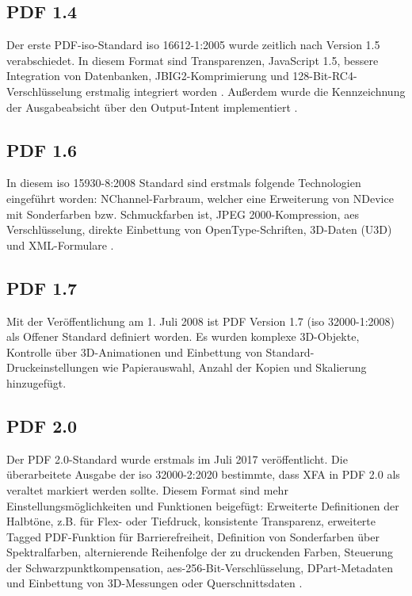 \subsection{PDF 1.4}
Der erste PDF-\gls{iso}-Standard \gls{iso} 16612-1:2005 wurde zeitlich nach Version 1.5 verabschiedet. In diesem Format sind Transparenzen, JavaScript 1.5, bessere Integration von Datenbanken, JBIG2-Komprimierung und 128-Bit-RC4-Verschlüsselung erstmalig integriert worden \cite{proj-consult}. Außerdem wurde die Kennzeichnung der Ausgabeabsicht über den Output-Intent implementiert \cite{schneeberger}.

\subsection{PDF 1.6}
In diesem \gls{iso} 15930-8:2008 Standard sind erstmals folgende Technologien eingeführt worden: NChannel-Farbraum, welcher eine Erweiterung von NDevice mit Sonderfarben bzw. Schmuckfarben ist, JPEG 2000-Kompression, \gls{aes} Verschlüsselung, direkte Einbettung von OpenType-Schriften, 3D-Daten (U3D) und XML-Formulare \cite{proj-consult}.

\subsection{PDF 1.7}
Mit der Veröffentlichung am 1. Juli 2008 ist PDF Version 1.7 (\gls{iso} 32000-1:2008) als Offener Standard definiert worden. Es wurden komplexe 3D-Objekte, Kontrolle über 3D-Animationen und Einbettung von Standard-Druckeinstellungen wie Papierauswahl, Anzahl der Kopien und Skalierung hinzugefügt\cite{proj-consult}.

\subsection{PDF 2.0}
Der PDF 2.0-Standard wurde erstmals im Juli 2017 veröffentlicht. Die überarbeitete Ausgabe der \gls{iso} 32000-2:2020 bestimmte, dass XFA in PDF 2.0 als veraltet markiert werden sollte. Diesem Format sind mehr Einstellungsmöglichkeiten und Funktionen beigefügt: Erweiterte Definitionen der Halbtöne, z.B. für Flex- oder Tiefdruck, konsistente Transparenz, erweiterte Tagged PDF-Funktion für Barrierefreiheit, Definition von Sonderfarben über Spektralfarben, alternierende Reihenfolge der zu druckenden Farben, Steuerung der Schwarzpunktkompensation, \gls{aes}-256-Bit-Verschlüsselung, DPart-Metadaten und Einbettung von 3D-Messungen oder Querschnittsdaten \cite{proj-consult}.